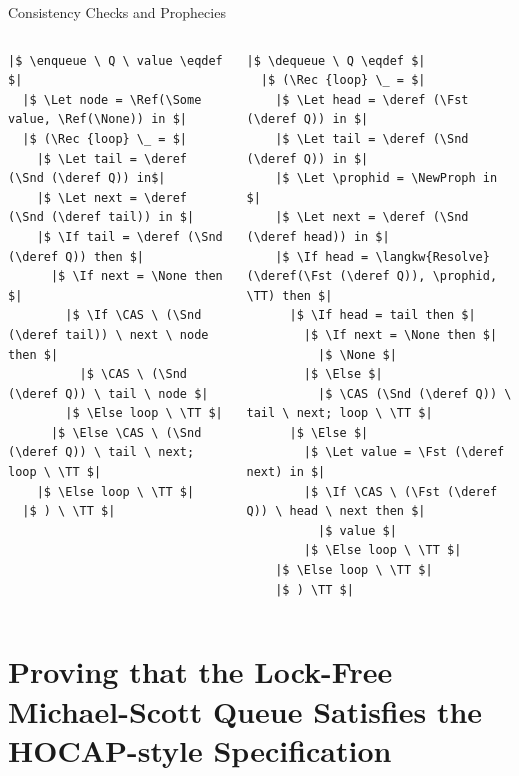 \documentclass[9pt,xcolor={dvipsnames}]{beamer}
\newcommand{\enqueue}{\operatorname{enqueue}}
\newcommand{\dequeue}{\operatorname{dequeue}}
\begin{document}
\begin{frame}[fragile]{Consistency Checks and Prophecies}
\begin{columns}
\begin{column}{0.5\textwidth}
\begin{verbatim}
|$ \enqueue \ Q \ value \eqdef $|
  |$ \Let node = \Ref(\Some value, \Ref(\None)) in $|
  |$ (\Rec {loop} \_ = $|
    |$ \Let tail = \deref (\Snd (\deref Q)) in$|
    |$ \Let next = \deref (\Snd (\deref tail)) in $|
    |$ \If tail = \deref (\Snd (\deref Q)) then $|
      |$ \If next = \None then $|
        |$ \If \CAS \ (\Snd (\deref tail)) \ next \ node then $|
          |$ \CAS \ (\Snd (\deref Q)) \ tail \ node $|
        |$ \Else loop \ \TT $|
      |$ \Else \CAS \ (\Snd (\deref Q)) \ tail \ next; loop \ \TT $|
    |$ \Else loop \ \TT $|
  |$ ) \ \TT $|
      \end{verbatim}
    \end{column}
    \begin{column}{0.5\textwidth}
      \begin{verbatim}
|$ \dequeue \ Q \eqdef $|
  |$ (\Rec {loop} \_ = $|
    |$ \Let head = \deref (\Fst (\deref Q)) in $|
    |$ \Let tail = \deref (\Snd (\deref Q)) in $|
    |$ \Let \prophid = \NewProph in $|
    |$ \Let next = \deref (\Snd (\deref head)) in $|
    |$ \If head = \langkw{Resolve} (\deref(\Fst (\deref Q)), \prophid, \TT) then $|
      |$ \If head = tail then $|
        |$ \If next = \None then $|
          |$ \None $|
        |$ \Else $|
          |$ \CAS (\Snd (\deref Q)) \ tail \ next; loop \ \TT $|
      |$ \Else $|
        |$ \Let value = \Fst (\deref next) in $|
        |$ \If \CAS \ (\Fst (\deref Q)) \ head \ next then $|
          |$ value $|
        |$ \Else loop \ \TT $|
    |$ \Else loop \ \TT $|
    |$ ) \TT $|
        \end{verbatim}
    \end{column}
  \end{columns}
\end{frame}


\section{Proving that the Lock-Free Michael-Scott Queue Satisfies the HOCAP-style Specification}
\end{document}

